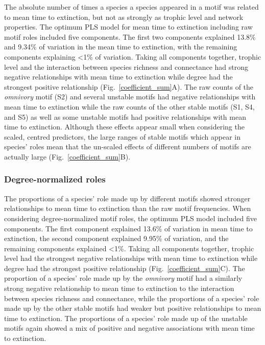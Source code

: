 \documentclass[12pt]{article}
\begin{document}
\begin{spacing}{2.0}
            The absolute number of times a species a species appeared in a motif was related to mean time to extinction, but not as strongly as trophic level and network properties.
            The optimum PLS model for mean time to extinction including raw motif roles included five components.
            The first two components explained 13.8\% and 9.34\% of variation in the mean time to extinction, with the remaining components explaining \textless1\% of variation.
            Taking all components together, trophic level and the interaction between species richness and connectance had strong negative relationships with mean time to extinction while degree had the strongest positive relationship (Fig.~\ref{coefficient_sum}A).
            The raw counts of the \emph{omnivory} motif (S2) and several unstable motifs had negative relationships with mean time to extinction while
            the raw counts of the other stable motifs (S1, S4, and S5) as well as some unstable motifs had positive relationships with mean time to extinction.
            Although these effects appear small when considering the scaled, centred predictors, the large ranges of stable motifs which appear in species' roles mean that the un-scaled effects of different numbers of motifs are actually large (Fig.~\ref{coefficient_sum}B).
                
        \subsubsection*{Degree-normalized roles}
        
    		The proportions of a species' role made up by different motifs showed stronger relationships to mean time to extinction than the raw motif frequencies.
    		When considering degree-normalized motif roles, the optimum PLS model included five components.
    		The first component explained 13.6\% of variation in mean time to extinction, the second component explained 9.95\% of variation, and the remaining components explained \textless1\%.
            Taking all components together, trophic level had the strongest negative relationships with mean time to extinction while degree had the strongest positive relationship (Fig.~\ref{coefficient_sum}C).
            The proportion of a species' role made up by the \emph{omnivory} motif had a similarly strong negative relationship to mean time to extinction to the interaction between species richness and connectance, while the proportions of a species' role made up by the other stable motifs had weaker but positive relationships to mean time to extinction.
            The proportions of a species' role made up of the unstable motifs again showed a mix of positive and negative associations with mean time to extinction.


\end{spacing}
\end{document}
